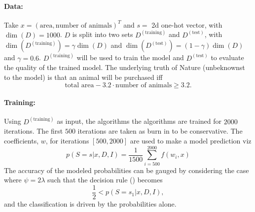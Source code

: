 \begin{example}
	
	
	
	\paragraph{Data:} Take $x=(\text{area},\text{number of animals})^T$ and $s=$ 2d one-hot vector, with $\dim(D)=1000$. $D$ is split into two sets $D^{(\text{training})}$ and $D^{(\text{test})}$, with $\dim(D^{(\text{training})})=\gamma\dim(D)$ and $\dim(D^{(\text{test})})=(1-\gamma)\dim(D)$ and $\gamma=0.6$. $D^{(\text{training})}$ will be used to train the model and $D^{(\text{test})}$ to evaluate the quality of the trained model. The underlying truth of Nature (unbeknownst to the model) is that an animal will be purchased iff
	\begin{equation}
		\text{total area}- 3.2\cdot\text{number of animals}\geq 3.2.
		\label{eq:nature}
	\end{equation}
	
	\paragraph{Training:} Using $D^{(\text{training})}$ as input, the algorithms the algorithms are trained for $2000$ iterations. The first $500$ iterations are taken as burn in to be conservative. The coefficients, $w$, for iterations $[500,2000]$ are used to make a model prediction viz
	\begin{equation}
		p(S= s|x,D,I)=\frac{1}{1500}\sum_{i=500}^{2000}f(w_i,x)
	\end{equation}
	The accuracy of the modeled probabilities can be gauged by considering the case where $\psi=2\lambda$ such that the decision rule () becomes
	\begin{equation}
		\frac{1}{2} < p(S= s_1|x,D,I),
		\label{eq:decision_rule2}
	\end{equation}
	and the classification is driven by the probabilities alone. 
	
	

\end{example}

